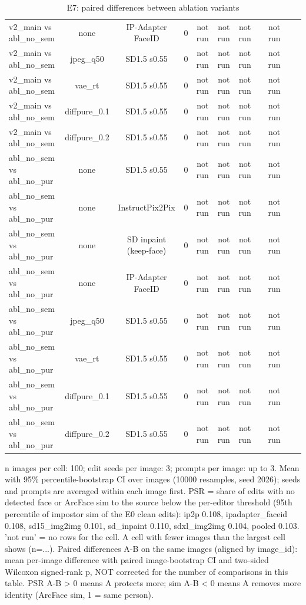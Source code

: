 \begin{table}[t]
{\begin{tabular}{lcccccccccc}
v2\_main vs abl\_no\_sem & none & IP-Adapter FaceID & 0 & not run & not run & not run &  & not run &  &  \\
v2\_main vs abl\_no\_sem & jpeg\_q50 & SD1.5 s0.55 & 0 & not run & not run & not run &  & not run &  &  \\
v2\_main vs abl\_no\_sem & vae\_rt & SD1.5 s0.55 & 0 & not run & not run & not run &  & not run &  &  \\
v2\_main vs abl\_no\_sem & diffpure\_0.1 & SD1.5 s0.55 & 0 & not run & not run & not run &  & not run &  &  \\
v2\_main vs abl\_no\_sem & diffpure\_0.2 & SD1.5 s0.55 & 0 & not run & not run & not run &  & not run &  &  \\
abl\_no\_sem vs abl\_no\_pur & none & SD1.5 s0.55 & 0 & not run & not run & not run &  & not run &  &  \\
abl\_no\_sem vs abl\_no\_pur & none & InstructPix2Pix & 0 & not run & not run & not run &  & not run &  &  \\
abl\_no\_sem vs abl\_no\_pur & none & SD inpaint (keep-face) & 0 & not run & not run & not run &  & not run &  &  \\
abl\_no\_sem vs abl\_no\_pur & none & IP-Adapter FaceID & 0 & not run & not run & not run &  & not run &  &  \\
abl\_no\_sem vs abl\_no\_pur & jpeg\_q50 & SD1.5 s0.55 & 0 & not run & not run & not run &  & not run &  &  \\
abl\_no\_sem vs abl\_no\_pur & vae\_rt & SD1.5 s0.55 & 0 & not run & not run & not run &  & not run &  &  \\
abl\_no\_sem vs abl\_no\_pur & diffpure\_0.1 & SD1.5 s0.55 & 0 & not run & not run & not run &  & not run &  &  \\
abl\_no\_sem vs abl\_no\_pur & diffpure\_0.2 & SD1.5 s0.55 & 0 & not run & not run & not run &  & not run &  &  \\
\bottomrule
\end{tabular}
}
\caption{E7: paired differences between ablation variants}
\label{tab:e7_paired}
\par\footnotesize n images per cell: 100; edit seeds per image: 3; prompts per image: up to 3. Mean with 95\% percentile-bootstrap CI over images (10000 resamples, seed 2026); seeds and prompts are averaged within each image first. PSR = share of edits with no detected face or ArcFace sim to the source below the per-editor threshold (95th percentile of impostor sim of the E0 clean edits): ip2p 0.108, ipadapter\_faceid 0.108, sd15\_img2img 0.101, sd\_inpaint 0.110, sdxl\_img2img 0.104, pooled 0.103. 'not run' = no rows for the cell. A cell with fewer images than the largest cell shows (n=...). Paired differences A-B on the same images (aligned by image\_id): mean per-image difference with paired image-bootstrap CI and two-sided Wilcoxon signed-rank p, NOT corrected for the number of comparisons in this table. PSR A-B > 0 means A protects more; sim A-B < 0 means A removes more identity (ArcFace sim, 1 = same person).
\end{table}
